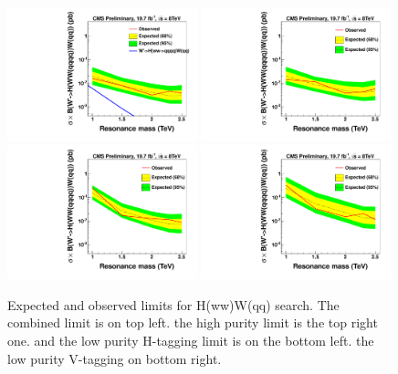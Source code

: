 \begin{figure}[h!tpb]
\begin{center}
\includegraphics[width=0.49\textwidth]{HqqqqZqqfigs/Limits/brazilianFlag_Hww_HwwWqqCombine.pdf}
\includegraphics[width=0.49\textwidth]{HqqqqZqqfigs/Limits/brazilianFlag_Hww_HwwWqq.pdf}
\includegraphics[width=0.49\textwidth]{HqqqqZqqfigs/Limits/brazilianFlag_Hww_HwwWqqLowH.pdf}
\includegraphics[width=0.49\textwidth]{HqqqqZqqfigs/Limits/brazilianFlag_Hww_HwwWqqLowV.pdf}
\end{center}
\caption{Expected and observed limits for H(ww)W(qq) search. The combined limit is on top left. the high purity limit
is the top right one. and the low purity H-tagging limit is on the bottom left. the low purity V-tagging on bottom right.   
}
\label{fig:HwwWqqLimits}
\end{figure}

